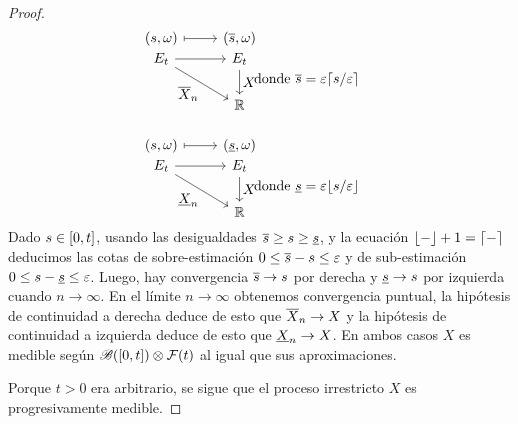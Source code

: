 \begin{proof}
  \begin{align}
    &\begin{tikzcd}
      [
        ampersand replacement=\&,
        execute at begin picture={
          \useasboundingbox (-1,-0.7) rectangle (1,1.3);
        }
      ]
      (s, \omega) 
      \arrow[r, mapsto]
        \& (\backPropagation{s}, \omega)
      \\[-2em]
      E_t
      \arrow{r}
      \arrow{rd}[swap]{\displaystyle \backPropagation{X}_n}
        \& E_t
          \arrow{d}{\displaystyle X}
      \\
        \&  \realNumbers
      \\
    \end{tikzcd}
    && \text{donde } \backPropagation{s} = \varepsilon \ceil{s / \varepsilon}
    \\\nonumber\\
    &\begin{tikzcd}
      [
        ampersand replacement=\&,
        execute at begin picture={
          \useasboundingbox (-1,-0.7) rectangle (1,1.3);
        }
      ]
      (s, \omega) 
      \arrow[r, mapsto]
        \& (\forwardPropagation{s}, \omega)
      \\[-2em]
      E_t
      \arrow{r}
      \arrow{rd}[swap]{\displaystyle \forwardPropagation{X}_n}
        \& E_t
          \arrow{d}{\displaystyle X}
      \\
        \&  \realNumbers
      \\
    \end{tikzcd}
    && \text{donde } \forwardPropagation{s} = \varepsilon \floor{s / \varepsilon}
  \end{align}
  Dado \(s \in \interval{cc}{0}{t}\), usando las desigualdades \(\overline{s} \geq s \geq \underline{s}\), y la ecuación \(\lfloor-\rfloor + 1 = \lceil-\rceil\) deducimos las cotas de sobre-estimación \(0 \leq \overline{s} - s \leq \varepsilon\) y de sub-estimación \(0 \leq s - \underline{s} \leq \varepsilon\).
  Luego, hay convergencia \(\overline{s} \rightarrow s\) por derecha y \(\underline{s} \rightarrow s\) por izquierda cuando \(n \rightarrow \infty\).
  En el límite \(n \rightarrow \infty\) obtenemos convergencia puntual, la hipótesis de continuidad a derecha deduce de esto que \(\overline{X}_n \rightarrow X\) y la hipótesis de continuidad a izquierda deduce de esto que \(\underline{X}_n \rightarrow X\).
  En ambos casos \(X\) es medible según \(\mathscr{B}([0, t]) \otimes \mathcal{F}(t)\) al igual que sus aproximaciones.

  Porque \(t > 0\) era arbitrario, se sigue que el proceso irrestricto \(X\) es progresivamente medible.
\end{proof}

